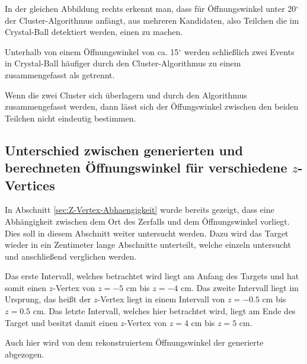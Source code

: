 \documentclass[a4paper,11pt,oneside,final,german,openbib,pdftex]{scrbook}
\begin{document}
{In der gleichen Abbildung rechts erkennt man, dass f\"ur \"Offnungswinkel unter 20$^{\circ}$ der Cluster-Algorithmus anf\"angt, aus mehreren Kandidaten, also Teilchen die im Crystal-Ball detektiert werden, einen zu machen.

Unterhalb von einem \"Offnungswinkel von ca. 15$^{\circ}$ werden schlie{\ss}lich zwei Events in Crystal-Ball h\"aufiger durch den Cluster-Algorithmus zu einem zusammengefasst als getrennt. 

Wenn die zwei Cluster sich \"uberlagern und durch den Algorithmus zusammengefasst werden, dann l\"asst sich der \"Offungswinkel zwischen den beiden Teilchen nicht eindeutig bestimmen.


\subsection{Unterschied zwischen generierten und berechneten \"Offnungswinkel f\"ur verschiedene $z$-Vertices}
\label{sec:Unterschied-Oeffnungswinkel-ZVertex}

In Abschnitt \ref{sec:Z-Vertex-Abhaengigkeit} wurde bereits gezeigt, dass eine Abh\"angigkeit zwischen dem Ort des Zerfalls und dem \"Offnungswinkel vorliegt. Dies soll in diesem Abschnitt weiter untersucht werden. Dazu wird das Target wieder in ein Zentimeter lange Abschnitte unterteilt, welche einzeln untersucht und anschlie{\ss}end verglichen werden.

Das erste Intervall, welches betrachtet wird liegt am Anfang des Targets und hat somit einen $z$-Vertex von $z=-5$ cm bis $z=-4$ cm. Das zweite Intervall liegt im Ursprung, das hei{\ss}t der $z$-Vertex liegt in einem Intervall von $z= -0.5$ cm bis $z = 0.5$ cm. Das letzte Intervall, welches hier betrachtet wird, liegt am Ende des Target und besitzt damit einen $z$-Vertex von $z= 4$ cm bis $z= 5$ cm.

Auch hier wird von dem rekonstruiertem \"Offnungswinkel der generierte abgezogen.


}
\end{document}
